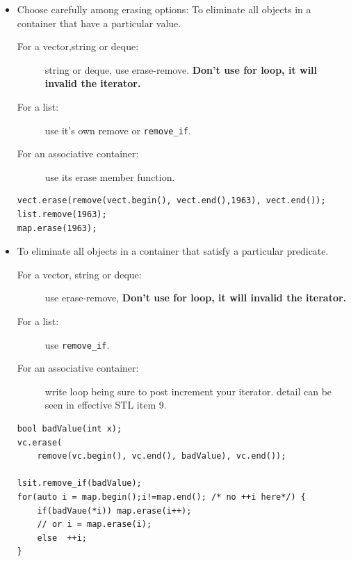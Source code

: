 \documentclass[a4paper,11pt,twoside]{book}
\begin{document}
\begin{itemize}
\item Choose carefully among erasing options:  To eliminate all objects in a container that have a particular value.
\begin{description}
\item [For a vector,string or deque:] string or deque, use erase-remove. \textbf{Don't use for loop, it will invalid the iterator.}

\item [For a list:] use it's own remove or \texttt{remove\_if}.

\item [For an associative container:] use its erase member function.
\end{description}

\begin{lstlisting}[numbers=none]
vect.erase(remove(vect.begin(), vect.end(),1963), vect.end());
list.remove(1963);
map.erase(1963);
\end{lstlisting}

\item  To eliminate all objects in a container that satisfy a particular predicate.
\begin{description}
	\item [For a vector, string or deque:] use erase-remove, \textbf{Don't use for loop, it will invalid the iterator.}
	
	\item [For a list:] use \texttt{remove\_if}.
	
	\item [For an associative container:] write loop being sure to post increment your iterator. detail can be seen in effective STL item 9.
\end{description} 
\begin{lstlisting}[numbers=none]
bool badValue(int x);
vc.erase(
	remove(vc.begin(), vc.end(), badValue), vc.end());

lsit.remove_if(badValue);
for(auto i = map.begin();i!=map.end(); /* no ++i here*/) {
	if(badVaue(*i)) map.erase(i++);
	// or i = map.erase(i);
	else  ++i;
}
\end{lstlisting}


\end{itemize}
\end{document}
